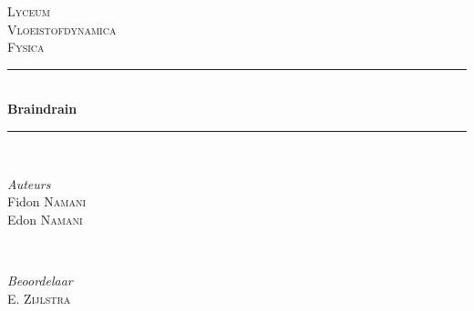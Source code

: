 \begin{titlepage} 
	\newcommand{\HRule}{\rule{\linewidth}{0.5mm}} %
	
	\center %
	
	
	\textsc{\LARGE Lyceum}\\[1.5cm] %
	
	\textsc{\Large Vloeistofdynamica}\\[0.5cm] %
	
	\textsc{\large Fysica}\\[0.5cm] %
	
	
	\HRule\\[0.4cm] %
	
	{\huge\bfseries Braindrain}\\[0.4cm] %
	
	\HRule\\[1.5cm]
	
	
	\begin{minipage}{0.4\textwidth}
		\begin{flushleft} %
			\large
			\textit{Auteurs}\\
			Fidon \textsc{Namani}\\ %
		    Edon \textsc{Namani}
		\end{flushleft}
	\end{minipage}
	~ %
	\begin{minipage}{0.4\textwidth}
		\begin{flushright} %
			\large
			\textit{Beoordelaar}\\
			 \textsc{E. Zijlstra} %
		\end{flushright}
	\end{minipage}



\end{titlepage}
